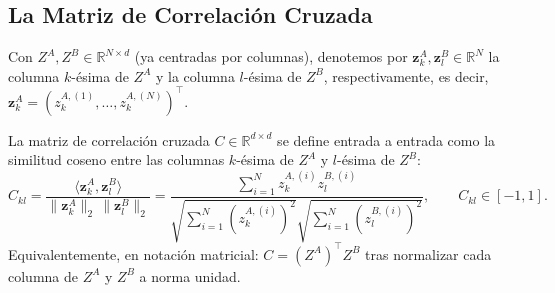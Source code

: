 \subsection{La Matriz de Correlación Cruzada}

Con $Z^A, Z^B \in \mathbb{R}^{N \times d}$ (ya centradas por columnas), denotemos por $\mathbf{z}_k^A, \mathbf{z}_l^B \in \mathbb{R}^N$ la columna $k$-ésima de $Z^A$ y la columna $l$-ésima de $Z^B$, respectivamente, es decir, $\mathbf{z}_k^A = (z_k^{A,(1)}, \dots, z_k^{A,(N)})^\top$.

\begin{definition}
La matriz de correlación cruzada $C \in \mathbb{R}^{d \times d}$ se define entrada a entrada como la similitud coseno entre las columnas $k$-ésima de $Z^A$ y $l$-ésima de $Z^B$:
\begin{equation}
C_{kl} = \frac{\langle \mathbf{z}_k^A, \mathbf{z}_l^B \rangle}{\|\mathbf{z}_k^A\|_2 \, \|\mathbf{z}_l^B\|_2} = \frac{\sum_{i=1}^{N} z_k^{A,(i)} z_l^{B,(i)}}{\sqrt{\sum_{i=1}^{N} (z_k^{A,(i)})^2} \sqrt{\sum_{i=1}^{N} (z_l^{B,(i)})^2}}, \qquad C_{kl} \in [-1,1].
\end{equation}
Equivalentemente, en notación matricial: $C = (Z^A)^\top Z^B$ tras normalizar cada columna de $Z^A$ y $Z^B$ a norma unidad.
\end{definition}

